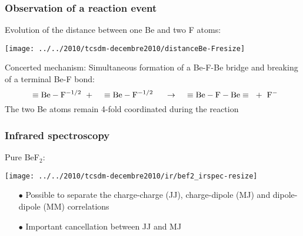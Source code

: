 \documentclass{beamer}
\begin{document}
\begin{frame}
  \frametitle{Observation of a reaction event}
  Evolution of the distance between one Be and two F atoms:
  \begin{center}
   \texttt{[image: ../../2010/tcsdm-decembre2010/distanceBe-Fresize]}
  \end{center}  
  Concerted mechanism: Simultaneous formation of a Be-F-Be bridge and breaking of a terminal Be-F bond:
     \begin{equation}
        \hspace{0.2cm}\equiv{\rm Be}-{\rm F}^{-1/2}\hspace{0.2cm}+ \hspace{0.2cm}\hspace{0.2cm}\equiv{\rm Be}-{\rm F}^{-1/2} \hspace{0.5cm}\rightarrow \hspace{0.5cm}\equiv{\rm Be}-{\rm F}-{\rm Be}\equiv \hspace{0.2cm}+ \hspace{0.2cm}{\rm F}^- \nonumber
     \end{equation}
  The two Be atoms remain 4-fold coordinated during the reaction
\end{frame}

\begin{frame}
   \frametitle{Infrared spectroscopy}
   Pure BeF$_2$: 
      \begin{center}
       \texttt{[image: ../../2010/tcsdm-decembre2010/ir/bef2\_irspec-resize]}
      \end{center}
     \begin{itemize}
       \item[$\bullet$] Possible to separate the charge-charge (JJ), charge-dipole (MJ) and dipole-dipole (MM) correlations
       \item[$\bullet$] Important cancellation between JJ and MJ
     \end{itemize}
\end{frame}
\end{document}

